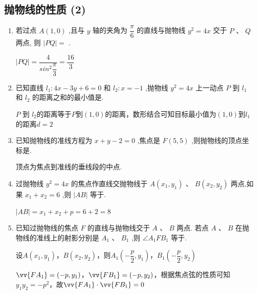 \subsection*{抛物线的性质 (2)}
\begin{enumerate}
    \item 若过点 $A\left( {1,0}\right)$ ,且与 $y$ 轴的夹角为 $\dfrac{\pi }{6}$ 的直线与抛物线 ${y}^{2} = {4x}$ 交于 $P\text{ 、 }Q$ 两点, 则 $\left| {PQ}\right|  =$ .
    \begin{jieda}
        $|PQ| = \dfrac{4}{sin^2\dfrac{\pi}{3}} = \dfrac{16}{3}$
    \end{jieda}
    
    \item 已知直线 ${l}_{1} : {4x} - {3y} + 6 = 0$ 和 ${l}_{2} : x =  - 1$ ,抛物线 ${y}^{2} = {4x}$ 上一动点 $P$ 到 ${l}_{1}$ 和 ${l}_{2}$ 的距离之和的最小值是.
    \begin{jieda}
        $P$ 到 ${l}_2$的距离等于$P$到$(1, 0)$的距离，数形结合可知目标最小值为$(1, 0)$到$l_1$的距离$d = 2$
    \end{jieda}
    
    \item 已知抛物线的准线方程为 $x + y - 2 = 0$ ,焦点是 $F\left( {5,5}\right)$ ,则抛物线的顶点坐标是.
    \begin{jieda}
        顶点为焦点到准线的垂线段的中点.
    \end{jieda}

    \item 过抛物线 ${y}^{2} = {4x}$ 的焦点作直线交抛物线于 $A\left( {{x}_{1},{y}_{1}}\right) \text{ 、 }B\left( {{x}_{2},{y}_{2}}\right)$ 两点,如果 ${x}_{1} + {x}_{2} = 6$ ,则 $\left| {AB}\right|$ 等于.
    \begin{jieda}
        $|AB| = x_1+x_2+p = 6+2 = 8$
    \end{jieda}

    \item 已知过抛物线的焦点 $F$ 的直线与抛物线交于 $A\text{ 、 }B$ 两点. 若点 $A\text{ 、 }B$ 在抛物线的准线上的射影分别是 ${A}_{1}\text{ 、 }{B}_{1}$ ,则 $\angle {A}_{1}F{B}_{1}$ 等于.
    \begin{jieda}
        设$A(x_1, y_1)$，$B(x_2, y_2)$，则$A_1\left(-\dfrac{p}{2}, y_1\right)$，$B_1\left(-\dfrac{p}{2}, y_2\right)$

        $\vv{FA_1} = \left(-p, y_1\right)$，$\vv{FB_1} = \left(-p, y_2\right)$，根据焦点弦的性质可知$y_1y_2 = -p^2$，故$\vv{FA_1}\cdot\vv{FB_1} = 0$
    \end{jieda}



\end{enumerate}
